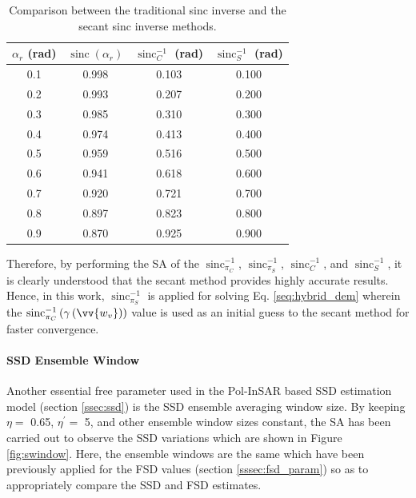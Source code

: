 \documentclass[review]{elsarticle}
\numberwithin{equation}{section}
\numberwithin{figure}{section}
\numberwithin{table}{section}
\DeclareMathOperator{\sinc}{sinc}
\begin{document}
\begin{table}[ht]
\centering
\caption{Comparison between the traditional \cite{Cloude2010} sinc inverse and the secant sinc inverse methods.}
\label{table:3}
\begin{tabular}{c c c c}
\hline
\boldmath$\alpha_r$ \textbf{(rad)} & \boldmath$\sinc\left(\alpha_r\right)$   & \boldmath$\sinc_C^{-1}$ \textbf{(rad)}     & \boldmath$\sinc_S^{-1}$ \textbf{(rad)} \\ \hline
0.1                 & 0.998            & 0.103          & 0.100  \\ 
0.2                 & 0.993            & 0.207          & 0.200  \\ 
0.3                 & 0.985            & 0.310          & 0.300  \\ 
0.4                 & 0.974            & 0.413          & 0.400  \\ 
0.5                 & 0.959            & 0.516          & 0.500   \\ 
0.6                 & 0.941            & 0.618          & 0.600  \\ 
0.7                 & 0.920            & 0.721          & 0.700   \\ 
0.8                 & 0.897            & 0.823          & 0.800 \\ 
0.9                 & 0.870            & 0.925          & 0.900 \\ \hline

\end{tabular}
\end{table}

Therefore, by performing the SA of the $\sinc_{\pi_C}^{-1}$, $\sinc_{\pi_S}^{-1}$, $\sinc_C^{-1}$, and $\sinc_S^{-1}$, it is clearly understood that the secant method provides highly accurate results. Hence, in this work, $\sinc_{\pi_S}^{-1}$ is applied for solving Eq. \eqref{seq:hybrid_dem} wherein the $\sinc_{\pi_C}^{-1}\left(\gamma\left(\vv{w_v}\right)\right)$ value is used as an initial guess to the secant method for faster convergence.

\paragraph*{SSD Ensemble Window}

Another essential free parameter used in the Pol-InSAR based SSD estimation model (section \ref{ssec:ssd}) is the SSD ensemble averaging window size. By keeping $\eta = $ 0.65, $\eta^\prime = $ 5, and other ensemble window sizes constant, the SA has been carried out to observe the SSD variations which are shown in Figure \ref{fig:swindow}. Here, the ensemble windows are the same which have been previously applied for the FSD values (section \ref{sssec:fsd_param}) so as to appropriately compare the SSD and FSD estimates.
\end{document}
